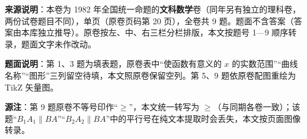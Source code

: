 

\begin{gktip}
\textbf{来源说明}：本卷为 1982 年全国统一命题的\textbf{文科数学}卷（同年另有独立的理科卷，两份试卷题目不同），单页（原卷页码第 20 页），全卷共 9 题。题面不含答案（答案由本库独立推导）。原卷按左、中、右三栏分栏排版，本文按题号 1—9 顺序转录，题面文字未作改动。

\textbf{题面说明}：第 1、3 题为填表题，原卷表中“使函数有意义的 $x$ 的实数范围”“曲线名称”“图形”三列留空待填，本文照原卷保留空列。第 5、9 题依原卷配图重绘为 TikZ 矢量图。

\textbf{源注}：第 9 题原卷不等号印作“$\geqslant$”，本文统一转写为 $\ge$（与同期各卷一致）；该题“$B_1A_1\parallel BA$”“$B_2A_2\parallel BA$”中的平行号在纯文本提取时会丢失，本文按页面图像转录。
\end{gktip}

